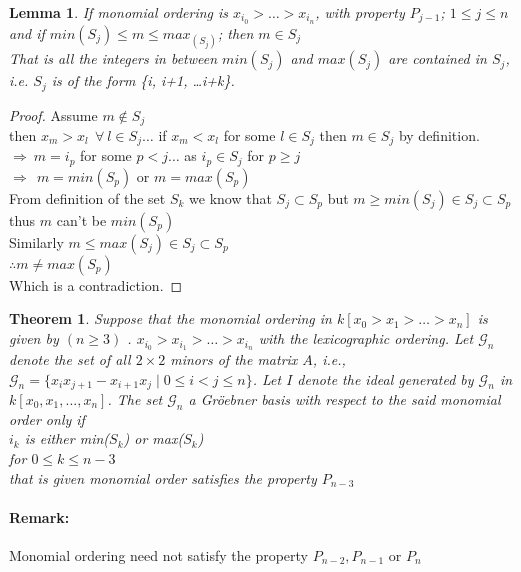 \documentclass[12pt,a4paper]{article}
\newtheorem{theorem}{Theorem}
\newtheorem{lemma}{Lemma}
\theoremstyle{definition}
\begin{document}
\begin{lemma}
If monomial ordering is $x_{i_{0}}> \ldots> x_{i_{n}}$, with property $P_{j-1}$; $1\leq j \leq n$ and if $min(S_j) \leq m \leq max_(S_j)$; then $m \in S_{j}$
\\
That is all the integers in between $min(S_{j})$ and $max(S_{j})$ are contained in $S_{j}$, i.e. $S_{j}$ is of the form \{i, i+1, \ldots i+k\}.

\end{lemma}


\begin{proof}
Assume $m\notin S_{j}$\\
then $x_{m} > x_{l} \ \  \forall \ l \in S_{j}  \ldots$ if $x_{m} < x_{l}$ for some $l \in S_{j}$ then $m\in S_{j}$ by definition.\\
$\Rightarrow \ m=i_{p}$ for some $p<j \ldots$ as $i_{p} \in S_j$ for $p \geq j$ 
\\
$\Rightarrow \ \ m=min(S_{p})$ or $m=max(S_{p})$\\
From definition of the set $S_{k}$ we know that $S_{j} \subset S_{p}$
but $m \geq min(S_{j}) \in S_{j} \subset S_{p}$
\\
thus $m$ can't be $min(S_{p})$\\
Similarly $m \leq max(S_{j}) \in S_{j} \subset S_{p}$
\\
$\therefore m\neq max(S_{p})$\\
Which is a contradiction.

\end{proof}




\begin{theorem}
\noindent Suppose that the monomial ordering in $k[x_{0} > x_{1} > \ldots > x_{n}]$ is given by $( n \geq 3)$ .
$x_{i_{0}} > x_{i_{1}} > \ldots > x_{i_{n}} $ with the lexicographic ordering. Let $\mathcal{G}_n$ denote the set of all $2\times 2$ minors of the matrix $A$, i.e., $\mathcal{G}_n = \{x_{i}x_{j+1}-x_{i+1}x_{j} \mid 0 \leq i < j \leq n\}$. Let $I$ denote the  ideal  generated by $\mathcal{G}_n$ in $k[x_{0}, x_{1},...,x_{n}]$. The set $\mathcal{G}_n$ a Gr\"{o}ebner  basis with respect to the said monomial order only if \\
$i_{k}$ is either min($S_{k}$) or max($S_{k}$) \\
for $0 \leq k \leq n-3$\\
that is given monomial order satisfies the property $P_{n-3}$
\end{theorem}
\paragraph*{Remark:} Monomial ordering need not satisfy the property $P_{n-2}, P_{n-1}$ or $P_{n}$
\end{document}
